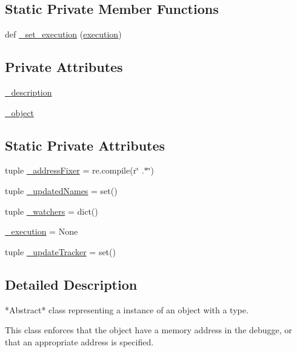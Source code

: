 \subsection*{Static Private Member Functions}
\begin{DoxyCompactItemize}
\item 
def \hyperlink{classmemoryoracle_1_1instance_1_1Memory_a3028b796b6b672b5cf23b1d9c89eebf0}{\+\_\+set\+\_\+execution} (\hyperlink{classmemoryoracle_1_1instance_1_1Memory_ad5fcccd559af49bd7a0ed2b25a08ec87}{execution})
\end{DoxyCompactItemize}
\subsection*{Private Attributes}
\begin{DoxyCompactItemize}
\item 
\hyperlink{classmemoryoracle_1_1instance_1_1Memory_a788ea83ee6828d6bc864acb07862d920}{\+\_\+description}
\item 
\hyperlink{classmemoryoracle_1_1instance_1_1Memory_a7359656d1a81dddfe450381200b44e80}{\+\_\+object}
\end{DoxyCompactItemize}
\subsection*{Static Private Attributes}
\begin{DoxyCompactItemize}
\item 
tuple \hyperlink{classmemoryoracle_1_1instance_1_1Memory_a95ef257acf3cfaa88c9b00ab11256a64}{\+\_\+address\+Fixer} = re.\+compile(r\char`\"{} .$\ast$\char`\"{})
\item 
tuple \hyperlink{classmemoryoracle_1_1instance_1_1Memory_a2ac9f507ee9de1420f11982237450ecb}{\+\_\+updated\+Names} = set()
\item 
tuple \hyperlink{classmemoryoracle_1_1instance_1_1Memory_aeeda16dba7e90242fd4e6e6161d709de}{\+\_\+watchers} = dict()
\item 
\hyperlink{classmemoryoracle_1_1instance_1_1Memory_a3919dc8184d2d87a2cf0fcd3f7c6b824}{\+\_\+execution} = None
\item 
tuple \hyperlink{classmemoryoracle_1_1instance_1_1Memory_abfe5ff52d9fa0a5b99fff473df6b4d8b}{\+\_\+update\+Tracker} = set()
\end{DoxyCompactItemize}


\subsection{Detailed Description}
\begin{DoxyVerb}*Abstract* class representing a instance of an object with a type.

This class enforces that the object have a memory address
in the debugge, or that an appropriate address is specified.
\end{DoxyVerb}
 

